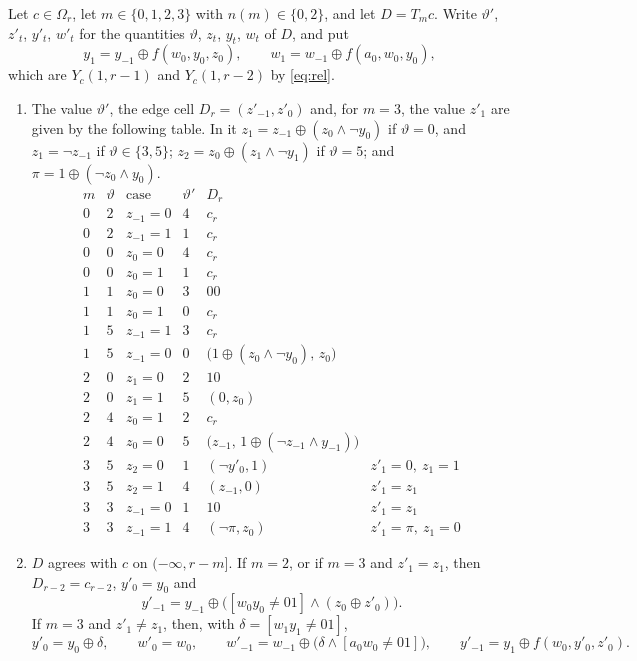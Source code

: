\begin{lemma}\label{c79:lem:M3}
Let $c\in\Omega_r$, let $m\in\{0,1,2,3\}$ with $n(m)\in\{0,2\}$, and let $D=T_mc$. Write $\vartheta'$, $z'_t$, $y'_t$, $w'_t$ for the quantities $\vartheta$, $z_t$, $y_t$, $w_t$ of $D$, and put
\[
y_1=y_{-1}\oplus f(w_0,y_0,z_0),\qquad w_1=w_{-1}\oplus f(a_0,w_0,y_0),
\]
which are $Y_c(1,r-1)$ and $Y_c(1,r-2)$ by \eqref{eq:rel}.
\begin{enumerate}
\item[(a)] The value $\vartheta'$, the edge cell $D_r=(z'_{-1},z'_0)$ and, for $m=3$, the value $z'_1$ are given by the following table. In it $z_1=z_{-1}\oplus(z_0\wedge\neg y_0)$ if $\vartheta=0$, and $z_1=\neg z_{-1}$ if $\vartheta\in\{3,5\}$; $z_2=z_0\oplus(z_1\wedge\neg y_1)$ if $\vartheta=5$; and $\pi=1\oplus(\neg z_0\wedge y_0)$.
\[
\begin{array}{cclcll}
m&\vartheta&\text{case}&\vartheta'&D_r&\\\hline
0&2&z_{-1}=0&4&c_r&\\
0&2&z_{-1}=1&1&c_r&\\
0&0&z_0=0&4&c_r&\\
0&0&z_0=1&1&c_r&\\
1&1&z_0=0&3&00&\\
1&1&z_0=1&0&c_r&\\
1&5&z_{-1}=1&3&c_r&\\
1&5&z_{-1}=0&0&\bigl(1\oplus(z_0\wedge\neg y_0),\,z_0\bigr)&\\
2&0&z_1=0&2&10&\\
2&0&z_1=1&5&(0,z_0)&\\
2&4&z_0=1&2&c_r&\\
2&4&z_0=0&5&\bigl(z_{-1},\,1\oplus(\neg z_{-1}\wedge y_{-1})\bigr)&\\
3&5&z_2=0&1&(\neg y'_0,1)&z'_1=0,\ z_1=1\\
3&5&z_2=1&4&(z_{-1},0)&z'_1=z_1\\
3&3&z_{-1}=0&1&10&z'_1=z_1\\
3&3&z_{-1}=1&4&(\neg\pi,z_0)&z'_1=\pi,\ z_1=0
\end{array}
\]
\item[(b)] $D$ agrees with $c$ on $(-\infty,r-m]$. If $m=2$, or if $m=3$ and $z'_1=z_1$, then $D_{r-2}=c_{r-2}$, $y'_0=y_0$ and
\[
y'_{-1}=y_{-1}\oplus\bigl([w_0y_0\ne01]\wedge(z_0\oplus z'_0)\bigr).
\]
If $m=3$ and $z'_1\ne z_1$, then, with $\delta=[w_1y_1\ne01]$,
\[
y'_0=y_0\oplus\delta,\qquad w'_0=w_0,\qquad w'_{-1}=w_{-1}\oplus\bigl(\delta\wedge[a_0w_0\ne01]\bigr),\qquad y'_{-1}=y_1\oplus f(w_0,y'_0,z'_0).
\]
\end{enumerate}
\end{lemma}


